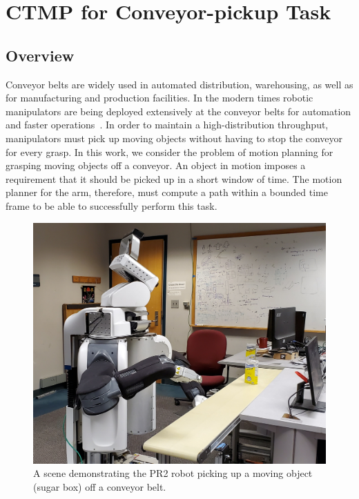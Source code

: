 \documentclass[a4paper]{report}
\begin{document}
\newpage
\chapter{CTMP for Conveyor-pickup Task}
\label{chap:rss}
\section{Overview}
Conveyor belts are widely used in automated distribution, warehousing, as well as for manufacturing and production facilities. In the modern times robotic manipulators are being deployed extensively at the conveyor belts for automation and faster operations~\cite{zhang2018gilbreth}. In order to maintain a high-distribution throughput, manipulators must pick up moving objects without having to stop the conveyor for every grasp. In this work, we consider the problem of motion planning for grasping moving objects off a conveyor. An object in motion imposes a requirement that it should be picked up in a short window of time. The motion planner for the arm, therefore, must compute a path within a bounded time frame to be able to successfully perform this task.

\begin{figure}[t]
    \centering
     \includegraphics[trim=0 50 0 100, clip, width=\columnwidth]{figs/cover_pic.jpg}
    \caption{
    \CaptionTextSize
    A scene demonstrating the PR2 robot picking up a moving object (sugar box) off a conveyor belt.}
    \label{fig:intro_pic}
\end{figure}
\end{document}
